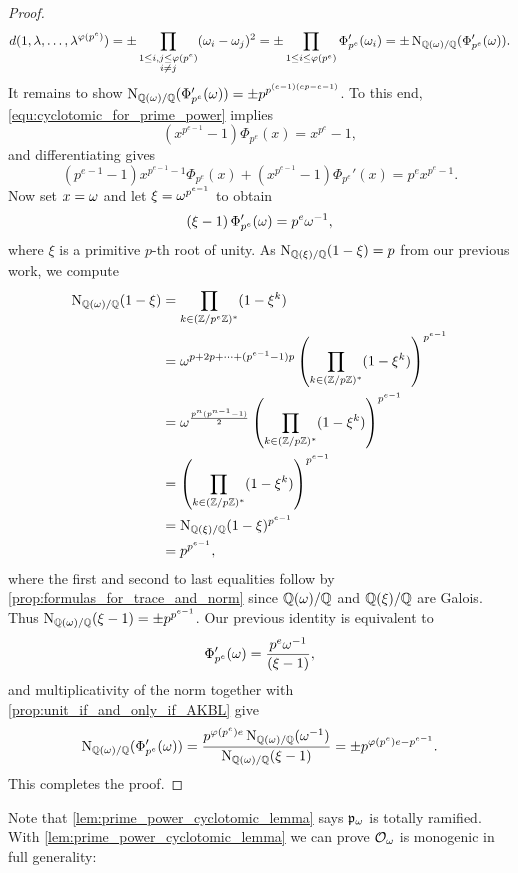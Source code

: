 \begin{proof}
      \[
        d(1,\lambda,\ldots,\lambda^{\varphi(p^{e})}) = \pm\prod_{\substack{1 \le i,j \le \varphi(p^{e}) \\ i \neq j}}(\omega_{i}-\omega_{j})^{2} = \pm\prod_{1 \le i \le \varphi(p^{e})}\Phi_{p^{e}}'(\omega_{i}) = \pm\operatorname{\mathrm{N}}_{\mathbb{Q}(\omega)/\mathbb{Q}}(\Phi_{p^{e}}'(\omega)).
      \]
      It remains to show $\operatorname{\mathrm{N}}_{\mathbb{Q}(\omega)/\mathbb{Q}}(\Phi_{p^{e}}'(\omega)) = \pm p^{p^{(e-1)(ep-e-1)}}$. To this end, \cref{equ:cyclotomic_for_prime_power} implies
      \[
        (x^{p^{e-1}}-1)\Phi_{p^{e}}(x) = x^{p^{e}}-1,
      \]
      and differentiating gives
      \[
        \left(p^{e-1}-1\right)x^{p^{e-1}-1}\Phi_{p^{e}}(x)+\left(x^{p^{e-1}}-1\right)\Phi_{p^{e}}'(x) = p^{e}x^{p^{e}-1}.
      \]
      Now set $x = \omega$ and let $\xi = \omega^{p^{e-1}}$ to obtain
      \[
        \left(\xi-1\right)\Phi_{p^{e}}'(\omega) = p^{e}\omega^{-1},
      \]
      where $\xi$ is a primitive $p$-th root of unity. As $\operatorname{\mathrm{N}}_{\mathbb{Q}(\xi)/\mathbb{Q}}(1-\xi) = p$ from our previous work, we compute
      \begin{align*}
        \operatorname{\mathrm{N}}_{\mathbb{Q}(\omega)/\mathbb{Q}}(1-\xi) &= \prod_{k \in (\mathbb{Z}/p^{e}\mathbb{Z})^{\ast}}(1-\xi^{k}) \\
        &= \omega^{p+2p+\cdots+(p^{e-1}-1)p}\left(\prod_{k \in (\mathbb{Z}/p\mathbb{Z})^{\ast}}(1-\xi^{k})\right)^{p^{e-1}} \\
        &= \omega^{\frac{p^{n}(p^{n-1}-1)}{2}}\left(\prod_{k \in (\mathbb{Z}/p\mathbb{Z})^{\ast}}(1-\xi^{k})\right)^{p^{e-1}} \\
        &= \left(\prod_{k \in (\mathbb{Z}/p\mathbb{Z})^{\ast}}(1-\xi^{k})\right)^{p^{e-1}} \\
        &= \operatorname{\mathrm{N}}_{\mathbb{Q}(\xi)/\mathbb{Q}}(1-\xi)^{p^{e-1}} \\
        &= p^{p^{e-1}},
      \end{align*}
      where the first and second to last equalities follow by \cref{prop:formulas_for_trace_and_norm} since $\mathbb{Q}(\omega)/\mathbb{Q}$ and $\mathbb{Q}(\xi)/\mathbb{Q}$ are Galois. Thus $\operatorname{\mathrm{N}}_{\mathbb{Q}(\omega)/\mathbb{Q}}(\xi-1) = \pm p^{p^{e-1}}$. Our previous identity is equivalent to
      \[
        \Phi_{p^{e}}'(\omega) = \frac{p^{e}\omega^{-1}}{\left(\xi-1\right)},
      \]
      and multiplicativity of the norm together with \cref{prop:unit_if_and_only_if_AKBL} give
      \[
        \operatorname{\mathrm{N}}_{\mathbb{Q}(\omega)/\mathbb{Q}}(\Phi_{p^{e}}'(\omega)) = \frac{p^{\varphi(p^{e})e}\operatorname{\mathrm{N}}_{\mathbb{Q}(\omega)/\mathbb{Q}}(\omega^{-1})}{\operatorname{\mathrm{N}}_{\mathbb{Q}(\omega)/\mathbb{Q}}(\xi-1)} = \pm p^{\varphi(p^{e})e-p^{e-1}}.
      \]
      This completes the proof.
    \end{proof}

    Note that \cref{lem:prime_power_cyclotomic_lemma} says $\mathfrak{p}_{\omega}$ is totally ramified. With \cref{lem:prime_power_cyclotomic_lemma} we can prove $\mathcal{O}_{\omega}$ is monogenic in full generality:

